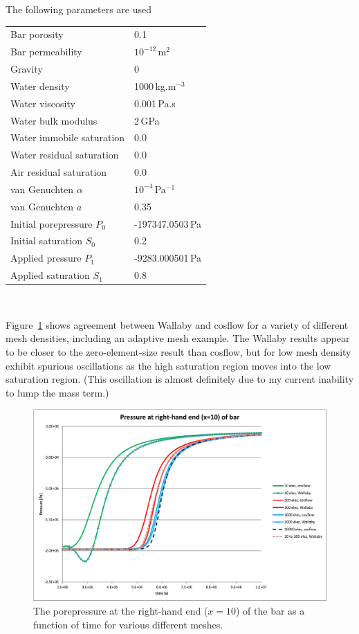 \documentclass[]{scrreprt}
\begin{document}
\noindent The following parameters are used \\
\begin{center}
\begin{tabular}{|ll|}
\hline
Bar porosity & 0.1 \\
Bar permeability & $10^{-12}$\,m$^{2}$ \\
\hline
Gravity & 0 \\
\hline
Water density & 1000\,kg.m$^{-3}$ \\
Water viscosity & 0.001\,Pa.s \\
Water bulk modulus & 2\,GPa \\
Water immobile saturation & 0.0 \\
Water residual saturation & 0.0 \\
Air residual saturation & 0.0 \\
\hline
van Genuchten $\alpha$ & $10^{-4}$\,Pa$^{-1}$ \\
van Genuchten $a$ & 0.35 \\
\hline
Initial porepressure $P_{0}$ & -197347.0503\,Pa \\
Initial saturation $S_{0}$ & 0.2 \\
Applied pressure $P_{1}$ & -9283.000501\,Pa \\
Applied saturation $S_{1}$ & 0.8 \\
\hline
\end{tabular} \\
\end{center}

Figure~\ref{uf.result.fig} shows agreement between Wallaby and
cosflow for a variety of different mesh densities, including an
adaptive mesh example.  The Wallaby results appear to be closer to the
zero-element-size result than cosflow, but for low mesh density
exhibit spurious oscillations as the high saturation region moves into
the low saturation region.  (This oscillation is almost definitely due
to my current inability to lump the mass term.)

\begin{figure}[htb]
\begin{center}
\includegraphics[width=17cm]{uf.eps}
\caption{The porepressure at the right-hand end ($x=10$) of the bar as
  a function of time for various different meshes.}
\label{uf.result.fig}
\end{center}
\end{figure}
\end{document}
